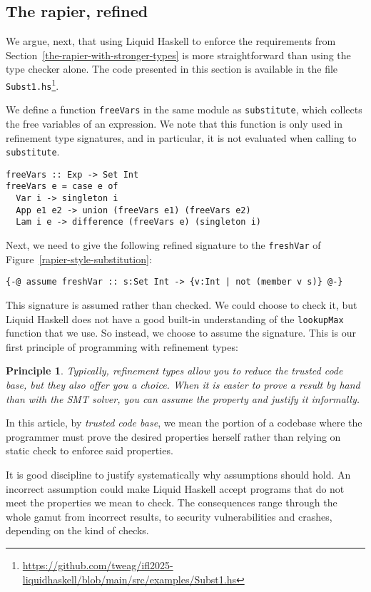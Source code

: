 \documentclass[sigconf, review]{acmart}
\newcommand{\tc}[1]{{\small\texttt{#1}}}
\newcommand{\sourcefile}[1]{\tc{#1}\footnote{\scriptsize\url{https://github.com/tweag/ifl2025-liquidhaskell/blob/main/src/examples/#1}}}
\newtheorem{principle}{Principle}
\begin{document}
\subsection{The rapier, refined}
\label{the-rapier-with-refinement-types}

We argue, next, that using Liquid Haskell to enforce the
requirements from Section~\ref{the-rapier-with-stronger-types} is more
straightforward than using the type checker alone. The code presented in this section is available in the file
\sourcefile{Subst1.hs}.

We define a function \tc{freeVars} in the same module as \tc{subs\-ti\-tute},
which collects the free variables of an expression. We note that this function
is only used in refinement type signatures, and in particular, it is not evaluated
when calling to \tc{substitute}.

\begin{verbatim}
freeVars :: Exp -> Set Int
freeVars e = case e of
  Var i -> singleton i
  App e1 e2 -> union (freeVars e1) (freeVars e2)
  Lam i e -> difference (freeVars e) (singleton i)
\end{verbatim}

Next, we need to give the following refined signature to the \tc{freshVar} of
Figure~\ref{rapier-style-substitution}:
\begin{verbatim}
{-@ assume freshVar :: s:Set Int -> {v:Int | not (member v s)} @-}
\end{verbatim}
This signature is assumed rather than checked. We could choose to check it, but
Liquid Haskell does not have a good built-in understanding of the \tc{lookupMax}
function that we use. So instead, we choose to assume the signature. This is our
first principle of programming with refinement types:

\begin{principle}
\label{assumption-principle}
  Typically, refinement types allow you to reduce the trusted code base, but they also offer
    you a choice. When it is easier to prove a result by
    hand than with the SMT solver, you can assume the property and
    justify it informally.
\end{principle}

In this article, by \emph{trusted code base}, we mean the portion of a
codebase where the programmer must prove the desired properties
herself rather than relying on static check to enforce said properties.

It is good discipline to justify systematically why assumptions should hold.
An incorrect assumption could make Liquid Haskell accept programs that do not
meet the properties we mean to check. The consequences range through the whole
gamut from incorrect results, to security vulnerabilities and crashes, depending
on the kind of checks.
\end{document}
